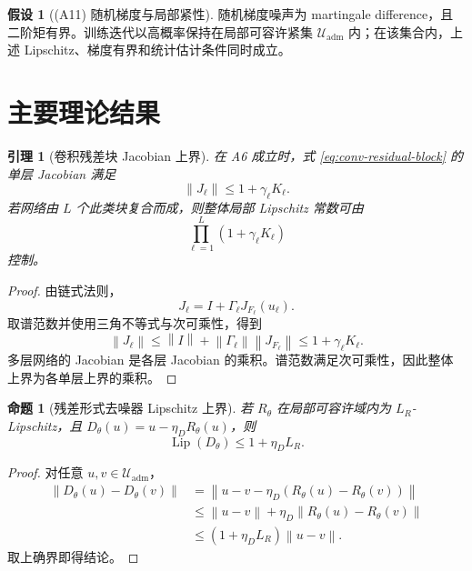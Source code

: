 \documentclass[11pt,a4paper,UTF8,fontset=fandol]{ctexart}
\newtheorem{lemma}[theorem]{引理}
\newtheorem{proposition}[theorem]{命题}
\theoremstyle{definition}
\newtheorem{assumption}[theorem]{假设}
\DeclareMathOperator{\Lip}{Lip}
\newcommand{\norm}[1]{\left\lVert#1\right\rVert}
\begin{document}
\begin{assumption}[(A11) 随机梯度与局部紧性]
随机梯度噪声为 martingale difference，且二阶矩有界。训练迭代以高概率保持在局部可容许紧集 $\mathcal U_{\mathrm{adm}}$ 内；在该集合内，上述 Lipschitz、梯度有界和统计估计条件同时成立。
\end{assumption}

\section{主要理论结果}
\label{sec:main-results}

\begin{lemma}[卷积残差块 Jacobian 上界]
\label{lem:residual-block}
在 A6 成立时，式 \eqref{eq:conv-residual-block} 的单层 Jacobian 满足
\begin{equation}
\label{eq:block-jac-bound}
    \norm{J_\ell}\le1+\gamma_\ell K_\ell.
\end{equation}
若网络由 $L$ 个此类块复合而成，则整体局部 Lipschitz 常数可由
\begin{equation}
\label{eq:network-lip-bound}
    \prod_{\ell=1}^L(1+\gamma_\ell K_\ell)
\end{equation}
控制。
\end{lemma}

\begin{proof}
由链式法则，
\begin{equation}
    J_\ell=I+\Gamma_\ell J_{F_\ell}(u_\ell).
\end{equation}
取谱范数并使用三角不等式与次可乘性，得到
\begin{equation}
    \norm{J_\ell}
    \le\norm{I}+\norm{\Gamma_\ell}\norm{J_{F_\ell}}
    \le1+\gamma_\ell K_\ell.
\end{equation}
多层网络的 Jacobian 是各层 Jacobian 的乘积。谱范数满足次可乘性，因此整体上界为各单层上界的乘积。
\end{proof}

\begin{proposition}[残差形式去噪器 Lipschitz 上界]
\label{prop:denoiser-lip}
若 $R_\theta$ 在局部可容许域内为 $L_R$-Lipschitz，且 $D_\theta(u)=u-\eta_D R_\theta(u)$，则
\begin{equation}
\label{eq:denoiser-lip}
    \Lip(D_\theta)\le1+\eta_D L_R.
\end{equation}
\end{proposition}

\begin{proof}
对任意 $u,v\in\mathcal U_{\mathrm{adm}}$，
\begin{equation}
\begin{aligned}
    \norm{D_\theta(u)-D_\theta(v)}
    &=\norm{u-v-\eta_D(R_\theta(u)-R_\theta(v))}\\
    &\le\norm{u-v}
    +\eta_D\norm{R_\theta(u)-R_\theta(v)}\\
    &\le(1+\eta_D L_R)\norm{u-v}.
\end{aligned}
\end{equation}
取上确界即得结论。
\end{proof}
\end{document}
